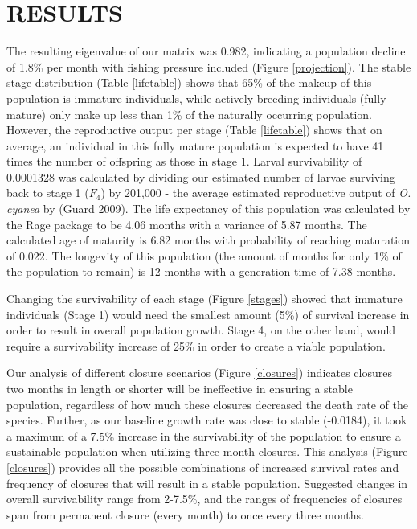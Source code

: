 \documentclass[
]{article}
\begin{document}
\hypertarget{results}{%
\section{RESULTS}\label{results}}

The resulting eigenvalue of our matrix was 0.982, indicating a population decline of 1.8\% per month with fishing pressure included (Figure \ref{projection}). The stable stage distribution (Table \ref{lifetable}) shows that 65\% of the makeup of this population is immature individuals, while actively breeding individuals (fully mature) only make up less than 1\% of the naturally occurring population. However, the reproductive output per stage (Table \ref{lifetable}) shows that on average, an individual in this fully mature population is expected to have 41 times the number of offspring as those in stage 1. Larval survivability of 0.0001328 was calculated by dividing our estimated number of larvae surviving back to stage 1 (\(F_4\)) by 201,000 - the average estimated reproductive output of \emph{O. cyanea} by (Guard 2009). The life expectancy of this population was calculated by the Rage package to be 4.06 months with a variance of 5.87 months. The calculated age of maturity is 6.82 months with probability of reaching maturation of 0.022. The longevity of this population (the amount of months for only 1\% of the population to remain) is 12 months with a generation time of 7.38 months.

Changing the survivability of each stage (Figure \ref{stages}) showed that immature individuals (Stage 1) would need the smallest amount (5\%) of survival increase in order to result in overall population growth. Stage 4, on the other hand, would require a survivability increase of 25\% in order to create a viable population.

Our analysis of different closure scenarios (Figure \ref{closures}) indicates closures two months in length or shorter will be ineffective in ensuring a stable population, regardless of how much these closures decreased the death rate of the species. Further, as our baseline growth rate was close to stable (-0.0184), it took a maximum of a 7.5\% increase in the survivability of the population to ensure a sustainable population when utilizing three month closures. This analysis (Figure \ref{closures}) provides all the possible combinations of increased survival rates and frequency of closures that will result in a stable population. Suggested changes in overall survivability range from 2-7.5\%, and the ranges of frequencies of closures span from permanent closure (every month) to once every three months.
\end{document}
